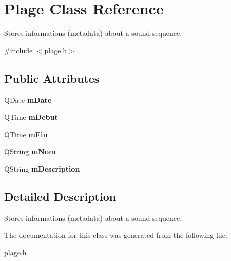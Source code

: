 \hypertarget{classPlage}{
\section{Plage Class Reference}
\label{classPlage}
}


Stores informations (metadata) about a sound sequence.  




{\ttfamily \#include $<$plage.h$>$}

\subsection*{Public Attributes}
\begin{DoxyCompactItemize}
\item 
\hypertarget{classPlage_aaa9246529898e4f82874028eea85a18f}{
QDate {\bfseries mDate}}
\label{classPlage_aaa9246529898e4f82874028eea85a18f}

\item 
\hypertarget{classPlage_ad34de6fbe35e96f79affc3eeab743c80}{
QTime {\bfseries mDebut}}
\label{classPlage_ad34de6fbe35e96f79affc3eeab743c80}

\item 
\hypertarget{classPlage_ad2c694cf5b0c717902322a114f00781c}{
QTime {\bfseries mFin}}
\label{classPlage_ad2c694cf5b0c717902322a114f00781c}

\item 
\hypertarget{classPlage_adb250c55571fabafd04796de67e37b7f}{
QString {\bfseries mNom}}
\label{classPlage_adb250c55571fabafd04796de67e37b7f}

\item 
\hypertarget{classPlage_ab3f441bd551a6c79272a4d5b7f5bf681}{
QString {\bfseries mDescription}}
\label{classPlage_ab3f441bd551a6c79272a4d5b7f5bf681}

\end{DoxyCompactItemize}


\subsection{Detailed Description}
Stores informations (metadata) about a sound sequence. 

The documentation for this class was generated from the following file:\begin{DoxyCompactItemize}
\item 
plage.h\end{DoxyCompactItemize}
